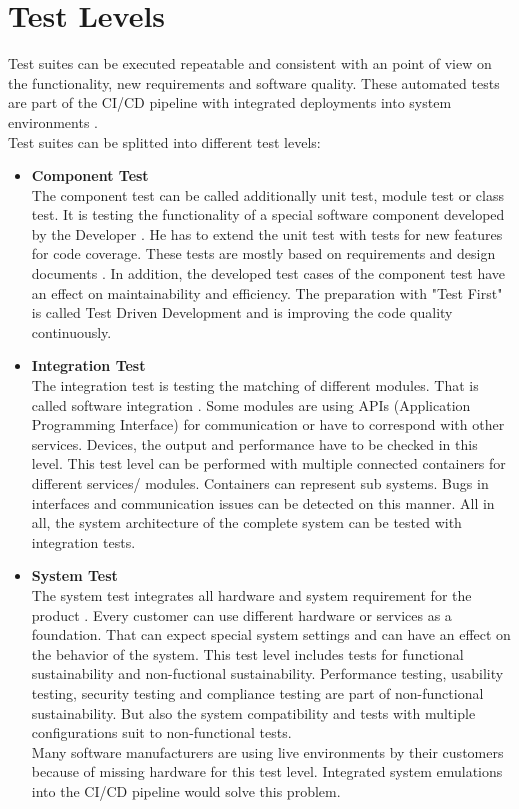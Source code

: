 \section{Test Levels}\label{TestLevel}

Test suites can be executed repeatable and consistent with an point of view on the functionality, new requirements and software quality. These automated tests are part of the CI/CD pipeline with integrated deployments into system environments \cite[~p.112]{Scholl2019}. \\
Test suites can be splitted into different test levels:
\begin{itemize}
\item \textbf{Component Test}  \\
The component test can be called additionally unit test, module test or class test. 
It is testing the functionality of a special software component developed by the Developer \cite[~p.66]{Spillner2019}.
He has to extend the unit test with tests for new features for code coverage. These tests are mostly based on requirements and design documents \cite[~p.63]{Spillner2019}. In addition, the developed test cases of the component test have an effect on maintainability and efficiency.
The preparation with "Test First" is called Test Driven Development and is improving the code quality continuously.

\item \textbf{Integration Test} \\
The integration test is testing the matching of different modules. That is called software integration \cite[~p.71]{Spillner2019}. Some modules are using APIs (Application Programming Interface) for communication or have to correspond with other services.
Devices, the output and performance have to be checked in this level.
This test level can be performed with multiple connected containers for different services/ modules. Containers can represent sub systems. Bugs in interfaces and communication issues can be detected on this manner.
All in all, the system architecture of the complete system can be tested with integration tests.

\item \textbf{System Test} \\
The system test integrates all hardware and system requirement for the product \cite[~p.79]{Spillner2019}.
Every customer can use different hardware or services as a foundation. That can expect special system settings and can have an effect on the behavior of the system.
This test level includes tests for functional sustainability \cite[~p.87]{Spillner2019} and non-fuctional sustainability.
Performance testing, usability testing, security testing and compliance testing are part of non-functional sustainability. But also the system compatibility and tests with multiple configurations suit to non-functional tests. \\
Many software manufacturers are using live environments by their customers because of missing hardware for this test level. Integrated system emulations into the CI/CD pipeline would solve this problem.


\end{itemize}
